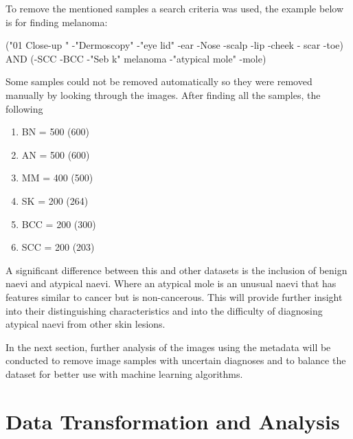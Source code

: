 To remove the mentioned samples a search criteria was used, the example below is for finding melanoma:

\begin{center}
("01 Close-up " -"Dermoscopy" -"eye lid" -ear -Nose -scalp -lip -cheek - scar -toe) AND (-SCC -BCC -"Seb k" melanoma -"atypical mole" -mole)
\end{center}

Some samples could not be removed automatically so they were removed manually by looking through the images. After finding all the samples, the following

\begin{enumerate}
\item BN = 500 (600)
\item AN = 500 (600)
\item MM = 400 (500)
\item SK = 200 (264)
\item BCC = 200 (300)
\item SCC = 200 (203)
\end{enumerate}

A significant difference between this and other datasets is the inclusion of benign naevi and atypical naevi. Where an atypical mole is an unusual naevi that has features similar to cancer but is non-cancerous. This will provide further insight into their distinguishing characteristics and into the difficulty of diagnosing atypical naevi from other skin lesions.

In the next section, further analysis of the images using the metadata will be conducted to remove image samples with uncertain diagnoses and to balance the dataset for better use with machine learning algorithms.

\section{Data Transformation and Analysis}

